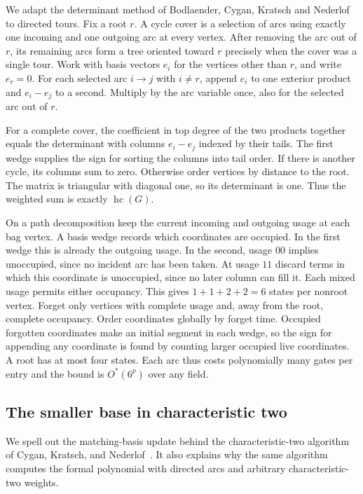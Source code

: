 \documentclass[11pt]{article}
\theoremstyle{definition}
\newcommand{\hc}{\operatorname{hc}}
\newcommand{\OO}{O^*}
\begin{document}
We adapt the determinant method of Bodlaender, Cygan, Kratsch and Nederlof~\cite{bckn} to directed tours. Fix a root \(r\). A cycle cover is a selection of arcs using exactly one incoming and one outgoing arc at every vertex. After removing the arc out of \(r\), its remaining arcs form a tree oriented toward \(r\) precisely when the cover was a single tour. Work with basis vectors \(e_i\) for the vertices other than \(r\), and write \(e_r=0\). For each selected arc \(i\to j\) with \(i\ne r\), append \(e_i\) to one exterior product and \(e_i-e_j\) to a second. Multiply by the arc variable once, also for the selected arc out of \(r\).

For a complete cover, the coefficient in top degree of the two products together equals the determinant with columns \(e_i-e_j\) indexed by their tails. The first wedge supplies the sign for sorting the columns into tail order. If there is another cycle, its columns sum to zero. Otherwise order vertices by distance to the root. The matrix is triangular with diagonal one, so its determinant is one. Thus the weighted sum is exactly \(\hc(G)\).

On a path decomposition keep the current incoming and outgoing usage at each bag vertex. A basis wedge records which coordinates are occupied. In the first wedge this is already the outgoing usage. In the second, usage \(00\) implies unoccupied, since no incident arc has been taken. At usage \(11\) discard terms in which this coordinate is unoccupied, since no later column can fill it. Each mixed usage permits either occupancy. This gives \(1+1+2+2=6\) states per nonroot vertex. Forget only vertices with complete usage and, away from the root, complete occupancy. Order coordinates globally by forget time. Occupied forgotten coordinates make an initial segment in each wedge, so the sign for appending any coordinate is found by counting larger occupied live coordinates. A root has at most four states. Each arc thus costs polynomially many gates per entry and the bound is \(\OO(6^p)\) over any field.

\subsection{The smaller base in characteristic two}

We spell out the matching-basis update behind the characteristic-two algorithm of Cygan, Kratsch, and Nederlof~\cite{ckn}. It also explains why the same algorithm computes the formal polynomial with directed arcs and arbitrary characteristic-two weights.
\end{document}

